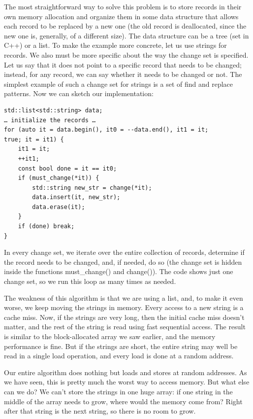 The most straightforward way to solve this problem is to store records in their own memory allocation and organize them in some data structure that allows each record to be replaced by a new one (the old record is deallocated, since the new one is, generally, of a different size). The data structure can be a tree (set in C++) or a list. To make the example more concrete, let us use strings for records. We also must be more specific about the way the change set is specified. Let us say that it does not point to a specific record that needs to be changed; instead, for any record, we can say whether it needs to be changed or not. The simplest example of such a change set for strings is a set of find and replace patterns. Now we can sketch our implementation:

\begin{lstlisting}[style=styleCXX]
std::list<std::string> data;
… initialize the records …
for (auto it = data.begin(), it0 = --data.end(), it1 = it;
true; it = it1) {
	it1 = it;
	++it1;
	const bool done = it == it0;
	if (must_change(*it)) {
		std::string new_str = change(*it);
		data.insert(it, new_str);
		data.erase(it);
	}
	if (done) break;
}
\end{lstlisting}

In every change set, we iterate over the entire collection of records, determine if the record needs to be changed, and, if needed, do so (the change set is hidden inside the functions must\_change() and change()). The code shows just one change set, so we run this loop as many times as needed.

The weakness of this algorithm is that we are using a list, and, to make it even worse, we keep moving the strings in memory. Every access to a new string is a cache miss. Now, if the strings are very long, then the initial cache miss doesn't matter, and the rest of the string is read using fast sequential access. The result is similar to the block-allocated array we saw earlier, and the memory performance is fine. But if the strings are short, the entire string may well be read in a single load operation, and every load is done at a random address.

Our entire algorithm does nothing but loads and stores at random addresses. As we have seen, this is pretty much the worst way to access memory. But what else can we do? We can't store the strings in one huge array: if one string in the middle of the array needs to grow, where would the memory come from? Right after that string is the next string, so there is no room to grow.

